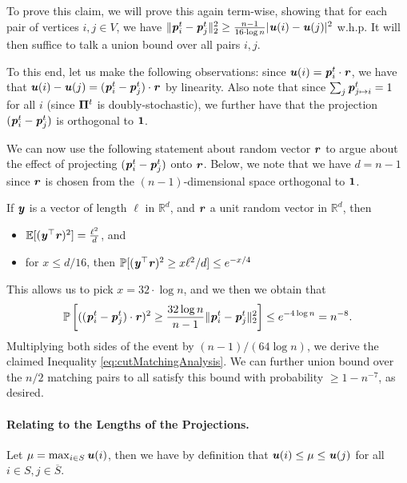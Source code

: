 To prove this claim, we will prove this again term-wise, showing that for each pair of vertices $i,j \in V$, we have $\|\boldsymbol{\mathit{p}}_{i}^t - \boldsymbol{\mathit{p}}_{j}^t \|_2^2 \geq \frac{n-1}{16 \cdot \log n} |\boldsymbol{\mathit{u}}(i) - \boldsymbol{\mathit{u}}(j)|^2$ w.h.p. It will then suffice to talk a union bound over all pairs $i,j$. 

To this end, let us make the following observations: since $\boldsymbol{\mathit{u}}(i) = \boldsymbol{\mathit{p}}_i^t \cdot \boldsymbol{\mathit{r}}$, we have that $\boldsymbol{\mathit{u}}(i) - \boldsymbol{\mathit{u}}(j) = (\boldsymbol{\mathit{p}}_i^t - \boldsymbol{\mathit{p}}_j^t) \cdot \boldsymbol{\mathit{r}}$ by linearity. Also note that since $\sum_j \boldsymbol{\mathit{p}}_{j \mapsto i}^t = 1$ for all $i$ (since $\boldsymbol{\Pi}^t$ is doubly-stochastic), we further have that the projection $(\boldsymbol{\mathit{p}}_i^t - \boldsymbol{\mathit{p}}_j^t)$ is orthogonal to $\boldsymbol{1}$.

We can now use the following statement about random vector $\boldsymbol{\mathit{r}}$ to argue about the effect of projecting $(\boldsymbol{\mathit{p}}_i^t - \boldsymbol{\mathit{p}}_j^t)$ onto $\boldsymbol{\mathit{r}}$. Below, we note that we have $d = n-1$ since $\boldsymbol{\mathit{r}}$ is chosen from the $(n-1)$-dimensional space orthogonal to $\boldsymbol{1}$.

\begin{theorem}\label{thm:factsGaussianAnnulus}
If $\boldsymbol{\mathit{y}}$ is a vector of length $\ell$ in $\mathbb{R}^d$, and $\boldsymbol{\mathit{r}}$ a unit random vector in $\mathbb{R}^d$, then
\begin{itemize}
    \item $\mathbb{E}[(\boldsymbol{\mathit{y}}^\top \boldsymbol{\mathit{r}})^2] = \frac{\ell^2}{d}$, and
    \item for $x \leq d/16$, then $\mathbb{P}[(\boldsymbol{\mathit{y}}^\top \boldsymbol{\mathit{r}})^2 \geq x\ell^2/d] \leq e^{-x/4}$
\end{itemize}
\end{theorem}

This allows us to pick $x = 32 \cdot \log n$, and we then we obtain that
\begin{equation}\label{eq:highProbEventCutMatching}
    \mathbb{P}\left[ ((\boldsymbol{\mathit{p}}_i^t - \boldsymbol{\mathit{p}}_j^t) \cdot \boldsymbol{\mathit{r}})^2 \geq  \frac{32 \log n}{n-1} \|\boldsymbol{\mathit{p}}_i^t - \boldsymbol{\mathit{p}}_j^t\|_2^2\right] \leq e^{-4 \log n} = n^{-8}.
\end{equation}
Multiplying both sides of the event by $(n-1)/(64 \log n)$, we derive the claimed Inequality  \eqref{eq:cutMatchingAnalysis}. We can further union bound over the $n/2$ matching pairs to all satisfy this bound with probability $\geq 1-n^{-7}$, as desired.

\paragraph{Relating to the Lengths of the Projections.} Let $\mu = \max_{i \in S} \boldsymbol{\mathit{u}}(i)$, then we have by definition that $\boldsymbol{\mathit{u}}(i) \leq \mu \leq \boldsymbol{\mathit{u}}(j)$ for all $i \in S, j \in \overline{S}$.

